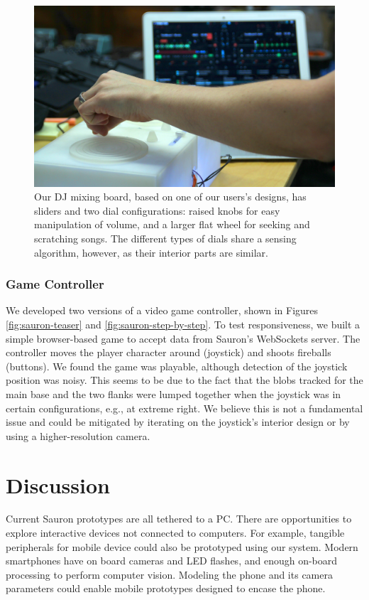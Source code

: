         \begin{figure}
\centering
\includegraphics[width=\textwidth]{figures/sauron/DJ-controller-action.JPG}
\caption{Our DJ mixing board, based on one of our users's designs, has sliders and two dial configurations: raised knobs for easy manipulation of volume, and a larger flat wheel for seeking and scratching songs. The different types of dials share a sensing algorithm, however, as their interior parts are similar.}
\label{fig:sauron-djmixer}
\end{figure}
        
        \subsubsection{Game Controller}
        We developed two versions of a video game controller, shown in Figures \ref{fig:sauron-teaser} and \ref{fig:sauron-step-by-step}. To test responsiveness, we built a simple browser-based game to accept data from Sauron's WebSockets server. The controller moves the player character around (joystick) and shoots fireballs (buttons). We found the game was playable, although detection of the joystick position was noisy. This seems to be due to the fact that the blobs tracked for the main base and the two flanks were lumped together when the joystick was in certain configurations, e.g., at extreme right. We believe this is not a fundamental issue and could be mitigated by iterating on the joystick's interior design or by using a higher-resolution camera.

\section{Discussion}

Current Sauron prototypes are all tethered to a PC. There are opportunities to explore interactive devices not connected to computers. For example, tangible peripherals for mobile device could also be prototyped using our system. Modern smartphones have on board cameras and LED flashes, and enough on-board processing to perform computer vision. Modeling the phone and its camera parameters could enable mobile prototypes designed to encase the phone.

